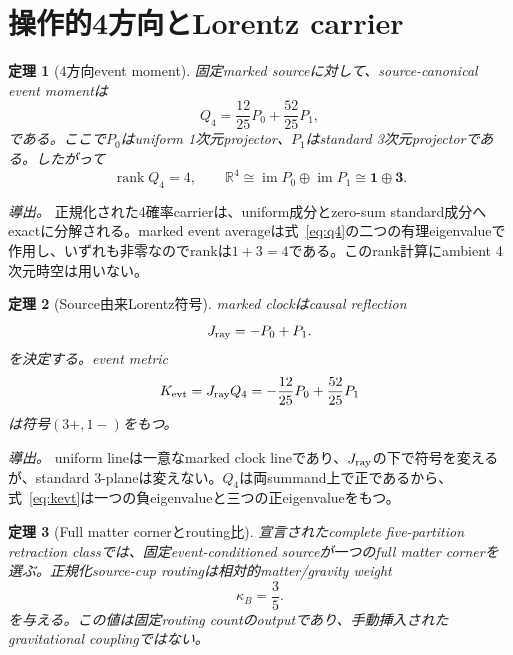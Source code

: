 \documentclass[11pt]{article}
\newtheorem{theorem}{定理}[section]
\theoremstyle{definition}
\theoremstyle{remark}
\newcommand{\rank}{\operatorname{rank}}
\begin{document}
\section{操作的4方向とLorentz carrier}

\begin{theorem}[4方向event moment]
固定marked sourceに対して、source-canonical event momentは
\begin{equation}
Q_4=\frac{12}{25}P_0+\frac{52}{25}P_1,
\label{eq:q4}
\end{equation}
である。ここで$P_0$はuniform 1次元projector、$P_1$はstandard 3次元projectorである。したがって
\begin{equation}
\rank Q_4=4,
\qquad
\mathbb R^4\cong\operatorname{im}P_0\oplus\operatorname{im}P_1
\cong \mathbf 1\oplus\mathbf 3.
\end{equation}
\end{theorem}

\textit{導出。} 正規化された4確率carrierは、uniform成分とzero-sum standard成分へexactに分解される。marked event averageは式~\eqref{eq:q4}の二つの有理eigenvalueで作用し、いずれも非零なのでrankは$1+3=4$である。このrank計算にambient 4次元時空は用いない。

\begin{theorem}[Source由来Lorentz符号]
marked clockはcausal reflection
\begin{equation}
J_{\rm ray}=-P_0+P_1.
\end{equation}
を決定する。event metric
\begin{equation}
K_{\rm evt}=J_{\rm ray}Q_4
=-\frac{12}{25}P_0+\frac{52}{25}P_1
\label{eq:kevt}
\end{equation}
は符号$(3+,1-)$をもつ。
\end{theorem}

\textit{導出。} uniform lineは一意なmarked clock lineであり、$J_{\rm ray}$の下で符号を変えるが、standard 3-planeは変えない。$Q_4$は両summand上で正であるから、式~\eqref{eq:kevt}は一つの負eigenvalueと三つの正eigenvalueをもつ。

\begin{theorem}[Full matter cornerとrouting比]
宣言されたcomplete five-partition retraction classでは、固定event-conditioned sourceが一つのfull matter cornerを選ぶ。正規化source-cup routingは相対的matter/gravity weight
\begin{equation}
\kappa_B=\frac35.
\label{eq:threefifths}
\end{equation}
を与える。この値は固定routing countのoutputであり、手動挿入されたgravitational couplingではない。
\end{theorem}
\end{document}

